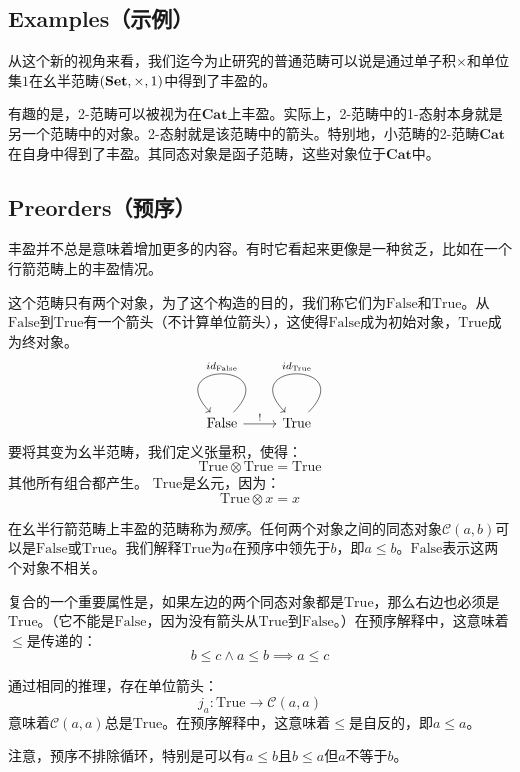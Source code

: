 \documentclass[DaoFP]{subfiles}
\begin{document}
 \subsection{Examples（示例）}

 从这个新的视角来看，我们迄今为止研究的普通范畴可以说是通过单子积$\times$和单位集$1$在幺半范畴$(\mathbf{Set}, \times, 1)$中得到了丰盈的。

 有趣的是，2-范畴可以被视为在$\mathbf{Cat}$上丰盈。实际上，2-范畴中的1-态射本身就是另一个范畴中的对象。2-态射就是该范畴中的箭头。特别地，小范畴的2-范畴$\mathbf{Cat}$在自身中得到了丰盈。其同态对象是函子范畴，这些对象位于$\mathbf{Cat}$中。

 \subsection{Preorders（预序）}

 丰盈并不总是意味着增加更多的内容。有时它看起来更像是一种贫乏，比如在一个行箭范畴上的丰盈情况。

 这个范畴只有两个对象，为了这个构造的目的，我们称它们为$\text{False}$和$\text{True}$。从$\text{False}$到$\text{True}$有一个箭头（不计算单位箭头），这使得$\text{False}$成为初始对象，$\text{True}$成为终对象。
 \[
  \begin{tikzcd}
   \text{False}
   \arrow[r, "!"]
   \arrow[loop, "id_{\text{False}}"']
   & \text{True}
   \arrow[loop, "id_{\text{True}}"']
  \end{tikzcd}
 \]
 要将其变为幺半范畴，我们定义张量积，使得：
 \[ \text{True} \otimes \text{True} = \text{True} \]
 其他所有组合都产生。
 $\text{True}$是幺元，因为：
 \[ \text{True} \otimes x = x \]

 在幺半行箭范畴上丰盈的范畴称为\emph{预序}。任何两个对象之间的同态对象$\mathcal C (a, b)$可以是$\text{False}$或$\text{True}$。我们解释$\text{True}$为$a$在预序中领先于$b$，即$a \le b$。$\text{False}$表示这两个对象不相关。

 复合的一个重要属性是，如果左边的两个同态对象都是$\text{True}$，那么右边也必须是$\text{True}$。（它不能是$\text{False}$，因为没有箭头从$\text{True}$到$\text{False}$。）在预序解释中，这意味着$\le$是传递的：
 \[ b \le c \land a \le b \implies a \le c \]

 通过相同的推理，存在单位箭头：
 \[ j_a \colon \text{True} \to \mathcal C(a, a) \]
 意味着$\mathcal C(a, a)$总是$\text{True}$。在预序解释中，这意味着$\le$是自反的，即$a \le a$。

 注意，预序不排除循环，特别是可以有$a \le b$且$b \le a$但$a$不等于$b$。
\end{document}
